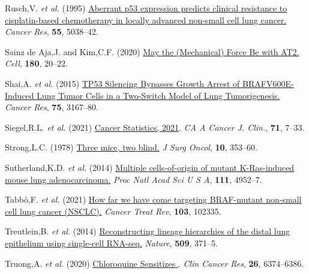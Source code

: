 \begin{CSLReferences}{1}{0}
\leavevmode{}%
Rusch,V. \emph{et al.} (1995) \href{https://www.ncbi.nlm.nih.gov/pubmed/7585548}{Aberrant p53 expression predicts clinical resistance to cisplatin-based chemotherapy in locally advanced non-small cell lung cancer.} \emph{Cancer Res}, \textbf{55}, 5038--42.

\leavevmode{}%
Sainz de Aja,J. and Kim,C.F. (2020) \href{https://doi.org/10.1016/j.cell.2019.12.020}{May the (Mechanical) Force Be with AT2.} \emph{Cell}, \textbf{180}, 20--22.

\leavevmode{}%
Shai,A. \emph{et al.} (2015) \href{https://doi.org/10.1158/0008-5472.can-14-3701}{TP53 Silencing Bypasses Growth Arrest of BRAFV600E-Induced Lung Tumor Cells in a Two-Switch Model of Lung Tumorigenesis.} \emph{Cancer Res}, \textbf{75}, 3167--80.

\leavevmode{}%
Siegel,R.L. \emph{et al.} (2021) \href{https://doi.org/10.3322/caac.21654}{Cancer Statistics, 2021}. \emph{CA A Cancer J. Clin.}, \textbf{71}, 7--33.

\leavevmode{}%
Strong,L.C. (1978) \href{https://doi.org/10.1002/jso.2930100410}{Three mice, two blind.} \emph{J Surg Oncol}, \textbf{10}, 353--60.

\leavevmode{}%
Sutherland,K.D. \emph{et al.} (2014) \href{https://doi.org/10.1073/pnas.1319963111}{Multiple cells-of-origin of mutant K-Ras-induced mouse lung adenocarcinoma.} \emph{Proc Natl Acad Sci U S A}, \textbf{111}, 4952--7.

\leavevmode{}%
Tabbò,F. \emph{et al.} (2021) \href{https://doi.org/10.1016/j.ctrv.2021.102335}{How far we have come targeting BRAF-mutant non-small cell lung cancer (NSCLC).} \emph{Cancer Treat Rev}, \textbf{103}, 102335.

\leavevmode{}%
Treutlein,B. \emph{et al.} (2014) \href{https://doi.org/10.1038/nature13173}{Reconstructing lineage hierarchies of the distal lung epithelium using single-cell RNA-seq.} \emph{Nature}, \textbf{509}, 371--5.

\leavevmode{}%
Truong,A. \emph{et al.} (2020) \href{https://doi.org/10.1158/1078-0432.ccr-20-1675}{Chloroquine Sensitizes }. \emph{Clin Cancer Res}, \textbf{26}, 6374--6386.


\end{CSLReferences}
